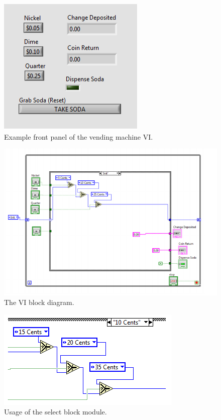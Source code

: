 \documentclass{article}
\begin{document}
\begin{figure}[h!]
\hspace{40mm} 
\includegraphics[scale=0.9]{figs/front_panel.png}
\caption{Example front panel of the vending machine VI.}
\label{fig:fp}
\end{figure}

\begin{figure}[h!]
\hspace{-10mm} 
\includegraphics[scale=0.8]{figs/block_diagram.png}
\caption{The VI block diagram.}
\label{fig:bd}
\end{figure}

\begin{figure}[h!]
\hspace{35mm} 
\includegraphics[scale=0.8]{figs/select_block.png}
\caption{Usage of the select block module.}
\label{fig:sb}
\end{figure}
\end{document}
